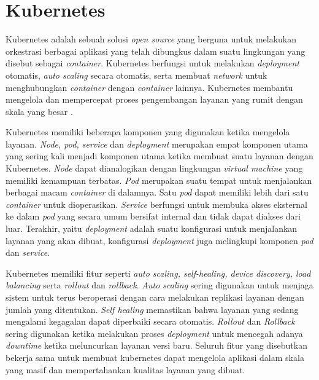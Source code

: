\section{Kubernetes}

Kubernetes adalah sebuah solusi \textit{open source} yang berguna untuk melakukan orkestrasi berbagai aplikasi yang telah dibungkus dalam suatu lingkungan yang disebut sebagai \textit{container}. Kubernetes berfungsi untuk melakukan \textit{deployment} otomatis, \textit{auto scaling} secara otomatis, serta membuat \textit{network} untuk menghubungkan \textit{container} dengan \textit{container} lainnya. Kubernetes membantu mengelola dan mempercepat proses pengembangan layanan yang rumit dengan skala yang besar \parencite{helmkubernetes}.

Kubernetes memiliki beberapa komponen yang digunakan ketika mengelola layanan. \textit{Node, pod, service} dan \textit{deployment} merupakan empat komponen utama yang sering kali menjadi komponen utama ketika membuat suatu layanan dengan Kubernetes. \textit{Node} dapat dianalogikan dengan lingkungan \textit{virtual machine} yang memiliki kemampuan terbatas. \textit{Pod} merupakan suatu tempat untuk menjalankan berbagai macam \textit{container} di dalamnya. Satu \textit{pod} dapat memiliki lebih dari satu \textit{container} untuk dioperasikan. \textit{Service} berfungsi untuk membuka akses eksternal ke dalam \textit{pod} yang secara umum bersifat internal dan tidak dapat diakses dari luar. Terakhir, yaitu \textit{deployment} adalah suatu konfigurasi untuk menjalankan layanan yang akan dibuat, konfigurasi \textit{deployment} juga melingkupi komponen \textit{pod} dan \textit{service}.

Kubernetes memiliki fitur seperti \textit{auto scaling, self-healing, device discovery, load balancing} serta \textit{rollout} dan \textit{rollback}. \textit{Auto scaling} sering digunakan untuk menjaga sistem untuk terus beroperasi dengan cara melakukan replikasi layanan dengan jumlah yang ditentukan. \textit{Self healing} memastikan bahwa layanan yang sedang mengalami kegagalan dapat diperbaiki secara otomatis. \textit{Rollout} dan \textit{Rollback} sering digunakan ketika melakukan proses \textit{deployment} untuk mencegah adanya \textit{downtime} ketika meluncurkan layanan versi baru. Seluruh fitur yang disebutkan bekerja sama untuk membuat kubernetes dapat mengelola aplikasi dalam skala yang masif dan mempertahankan kualitas layanan yang dibuat.





